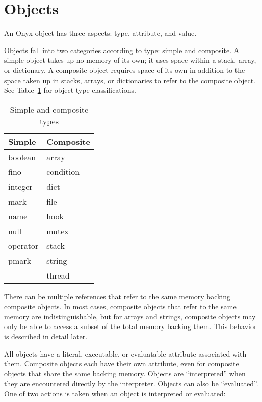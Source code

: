 \section{Objects}
\label{sec:onyx_objects}

An Onyx object has three aspects: type, attribute, and value.

Objects fall into two categories according to type: simple and composite.  A
simple object takes up no memory of its own; it uses space within a stack,
array, or dictionary.  A composite object requires space of its own in addition
to the space taken up in stacks, arrays, or dictionaries to refer to the
composite object.  See Table~\ref{simple-composite} for object type
classifications.

\begin{table}[htb]
\begin{center}
\begin{tabular}{|l|l|}
\hline
Simple	& Composite	\\
\hline \hline
boolean	& array		\\
fino	& condition	\\
integer	& dict		\\
mark	& file		\\
name	& hook		\\
null	& mutex		\\
operator & stack	\\
pmark	& string	\\
	& thread	\\
\hline
\end{tabular}
\end{center}
\caption{\label{simple-composite}
Simple and composite types}
\end{table}

There can be multiple references that refer to the same memory backing composite
objects.  In most cases, composite objects that refer to the same memory are
indistinguishable, but for arrays and strings, composite objects may only be
able to access a subset of the total memory backing them.  This behavior is
described in detail later.

All objects have a literal, executable, or evaluatable attribute associated with
them.  Composite objects each have their own attribute, even for composite
objects that share the same backing memory.  Objects are ``interpreted'' when
they are encountered directly by the interpreter.  Objects can also be
``evaluated''.  One of two actions is taken when an object is interpreted or
evaluated:


